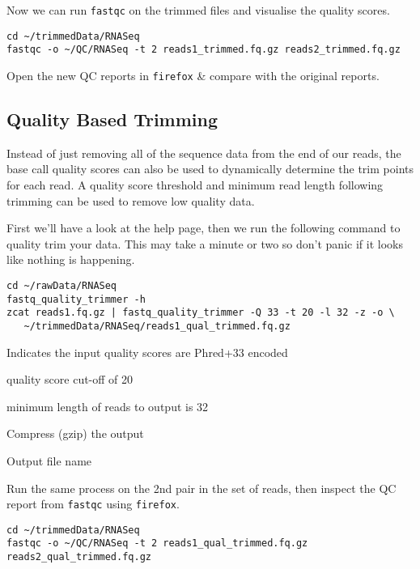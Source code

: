 \begin{steps}
Now we can run \texttt{fastqc} on the trimmed files and visualise the quality scores.
\begin{lstlisting}
cd ~/trimmedData/RNASeq
fastqc -o ~/QC/RNASeq -t 2 reads1_trimmed.fq.gz reads2_trimmed.fq.gz
\end{lstlisting}
Open the new QC reports in \texttt{firefox} \& compare with the original reports.
\end{steps}


\subsection{Quality Based Trimming}
Instead of just removing all of the sequence data from the end of our reads, the base call quality scores can also be used to dynamically determine the trim points for each read. 
A quality score threshold and minimum read length following trimming can be used to remove low quality data. \\
\begin{steps}
First we'll have a look at the help page, then we  run the following command to quality trim your data.
This may take a minute or two so don't panic if it looks like nothing is happening.
\begin{lstlisting}
cd ~/rawData/RNASeq
fastq_quality_trimmer -h
zcat reads1.fq.gz | fastq_quality_trimmer -Q 33 -t 20 -l 32 -z -o \
   ~/trimmedData/RNASeq/reads1_qual_trimmed.fq.gz
\end{lstlisting}
\end{steps}

\begin{note}
\begin{description}[style=multiline,labelindent=0cm,align=right,leftmargin=0.8\descriptionlabelspace,rightmargin=1.5cm,font=\ttfamily]
\item[-Q 33] Indicates the input quality scores are Phred+33 encoded
\item[-t 20] quality score cut-off of 20
\item[-l 32] minimum length of reads to output is 32
\item[-z] Compress (gzip) the output
\item[-o] Output file name
\end{description}
\end{note}

\begin{steps}
Run the same process on the 2nd pair in the set of reads, then inspect the QC report from \texttt{fastqc} using \texttt{firefox}.
\begin{lstlisting}
cd ~/trimmedData/RNASeq
fastqc -o ~/QC/RNASeq -t 2 reads1_qual_trimmed.fq.gz reads2_qual_trimmed.fq.gz
\end{lstlisting}
\end{steps}

